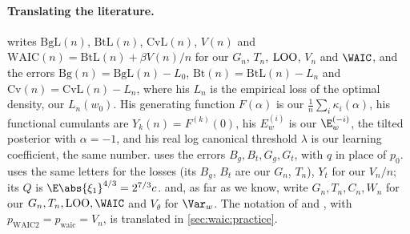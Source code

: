 \begin{refsection}
\paragraph{Translating the literature.} \textcite{Watanabe2010} writes $\mathrm{BgL}(n)$, $\mathrm{BtL}(n)$, $\mathrm{CvL}(n)$, $V(n)$ and $\mathrm{WAIC}(n)=\mathrm{BtL}(n)+\beta V(n)/n$ for our $G_n$, $T_n$, $\mathrm{LOO}$, $V_n$ and $\WAIC$, and the errors $\mathrm{Bg}(n)=\mathrm{BgL}(n)-L_0$, $\mathrm{Bt}(n)=\mathrm{BtL}(n)-L_n$ and $\mathrm{Cv}(n)=\mathrm{CvL}(n)-L_n$, where his $L_n$ is the empirical loss of the optimal density, our $L_n(w_0)$. His generating function $F(\alpha)$ is our $\frac1n\sum_i\kappa_i(\alpha)$, his functional cumulants are $Y_k(n)=F^{(k)}(0)$, his $E^{(i)}_w$ is our $\E^{(-i)}_w$, the tilted posterior with $\alpha=-1$, and his real log canonical threshold $\lambda$ is our learning coefficient, the same number. \textcite{Watanabe2010a} uses the errors $B_g,B_t,G_g,G_t$, with $q$ in place of $p_0$. \Textcite{Watanabe2010d} uses the same letters for the losses (its $B_g$, $B_t$ are our $G_n$, $T_n$), $Y_t$ for our $V_n/n$; its $Q$ is $\E\abs{\xi_1}^{4/3}=2^{7/3}c$. \textcite{Watanabe2024} and, as far as we know, \textcite{Watanabe2018} write $G_n,T_n,C_n,W_n$ for our $G_n,T_n,\waicLOO,\WAIC$ and $V_\theta$ for $\Var_w$. The notation of \textcite{GelmanEtAl2014} and \textcite{VehtariEtAl2017}, with $p_{\mathrm{WAIC}2}=p_{\mathrm{waic}}=V_n$, is translated in \cref{sec:waic:practice}.

\printchapterbib
\end{refsection}
